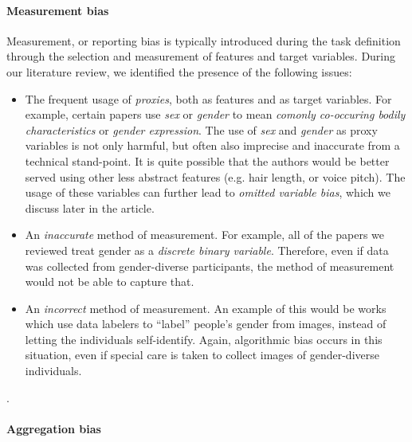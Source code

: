 \documentclass[nonacm,sigconf,review,balance=false]{acmart}
\begin{document}
\paragraph*{Measurement bias} Measurement, or reporting bias is typically introduced during the task definition through the selection and measurement of features and target variables. During our literature review, we identified the presence of the following issues:
\begin{itemize}
    \item The frequent usage of \emph{proxies}, both as features and as target variables. For example, certain papers use \emph{sex} or \emph{gender} to mean \emph{comonly co-occuring bodily characteristics} or \emph{gender expression}.
    The use of \emph{sex} and \emph{gender} as proxy variables is not only harmful, but often also imprecise and inaccurate from a technical stand-point. It is quite possible that the authors would be better served using other less abstract features (e.g. hair length, or voice pitch). The usage of these variables can further lead to \emph{omitted variable bias}, which we discuss later in the article.
    \item An \emph{inaccurate} method of measurement. For example, all of the papers we reviewed treat gender as a \emph{discrete binary variable}. Therefore, even if data was collected from gender-diverse participants, the method of measurement would not be able to capture that.
    \item An \emph{incorrect} method of measurement. An example of this would be works which use data labelers to ``label'' people's gender from images, instead of letting the individuals self-identify. Again, algorithmic bias occurs in this situation, even if special care is taken to collect images of gender-diverse individuals.
\end{itemize}.

\paragraph*{Aggregation bias} 
\end{document}
